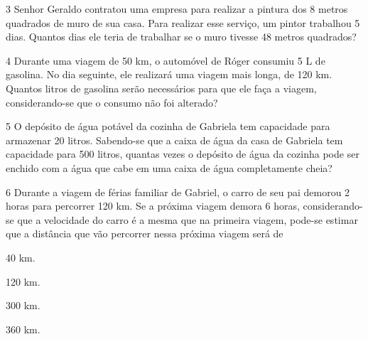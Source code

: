 \num{3} Senhor Geraldo contratou uma empresa para realizar a pintura dos 8
metros quadrados de muro de sua casa. Para realizar esse serviço, um pintor
trabalhou 5 dias. Quantos dias ele teria de trabalhar se o muro tivesse
48 metros quadrados?

\begin{mdframed}[linewidth=2pt,linecolor=salmao,roundcorner=2pt]
\vspace{2cm}
\end{mdframed}

\num{4} Durante uma viagem de 50 km, o automóvel de Róger consumiu 5 L de
gasolina. No dia seguinte, ele realizará uma viagem mais longa, de 120 km.
Quantos litros de gasolina serão necessários para que ele faça a viagem,
considerando-se que o consumo não foi alterado?

\begin{mdframed}[linewidth=2pt,linecolor=salmao,roundcorner=2pt]

\end{mdframed}



\num{5} O depósito de água potável da cozinha de Gabriela tem capacidade para
armazenar 20 litros. Sabendo-se que a caixa de água da casa de Gabriela
tem capacidade para 500 litros, quantas vezes o depósito de água da
cozinha pode ser enchido com a água que cabe em uma caixa de água
completamente cheia?

\begin{mdframed}[linewidth=2pt,linecolor=salmao,roundcorner=2pt]
\vspace{2cm}
\end{mdframed}


\num{6} Durante a viagem de férias familiar de Gabriel, o carro de seu pai
demorou 2 horas para percorrer 120 km. Se a próxima viagem demora 6
horas, considerando-se que a velocidade do carro é a mesma que na primeira
viagem, pode-se estimar que a distância que vão percorrer nessa próxima
viagem será de

\begin{minipage}{.5\textwidth}
\begin{escolha}
\item
  40 km.
\item
  120 km.
\item
  300 km.
\item
  360 km.
\end{escolha}
\end{minipage}

